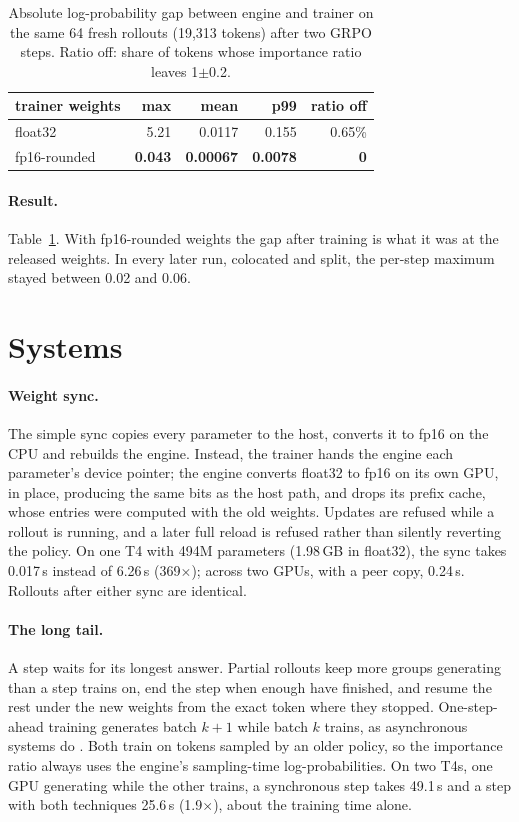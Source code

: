 \documentclass[11pt]{article}
\newcommand{\x}{$\times$}
\begin{document}
\begin{table}[t]
\centering
\small
\begin{tabular}{lrrrr}
\toprule
trainer weights & max & mean & p99 & ratio off \\
\midrule
float32 & 5.21 & 0.0117 & 0.155 & 0.65\% \\
fp16-rounded & \textbf{0.043} & \textbf{0.00067} & \textbf{0.0078} & \textbf{0} \\
\bottomrule
\end{tabular}
\caption{Absolute log-probability gap between engine and trainer on the same 64 fresh rollouts
(19,313 tokens) after two GRPO steps. Ratio off: share of tokens whose importance ratio
leaves 1$\pm$0.2.}
\label{tab:gap}
\end{table}

\paragraph{Result.} Table~\ref{tab:gap}. With fp16-rounded weights the gap after training is what it
was at the released weights. In every later run, colocated and split, the per-step maximum stayed
between 0.02 and 0.06.

\section{Systems}
\label{sec:systems}

\paragraph{Weight sync.} The simple sync copies every parameter to the host, converts it to fp16 on
the CPU and rebuilds the engine. Instead, the trainer hands the engine each parameter's device
pointer; the engine converts float32 to fp16 on its own GPU, in place, producing the same bits as
the host path, and drops its prefix cache, whose entries were computed with the old weights.
Updates are refused while a rollout is running, and a later full reload is refused rather than
silently reverting the policy. On one T4 with 494M parameters (1.98\,GB in float32), the sync
takes 0.017\,s instead of 6.26\,s (369\x); across two GPUs, with a peer copy, 0.24\,s. Rollouts
after either sync are identical.

\paragraph{The long tail.} A step waits for its longest answer. Partial rollouts
\citep{kimi2025k15} keep more groups generating than a step trains on, end the step when enough
have finished, and resume the rest under the new weights from the exact token where they stopped.
One-step-ahead training generates batch $k{+}1$ while batch $k$ trains, as asynchronous systems do
\citep{fu2025areal}. Both train on tokens sampled by an older policy, so the importance ratio
always uses the engine's sampling-time log-probabilities. On two T4s, one GPU generating while the
other trains, a synchronous step takes 49.1\,s and a step with both techniques 25.6\,s (1.9\x),
about the training time alone.
\end{document}
